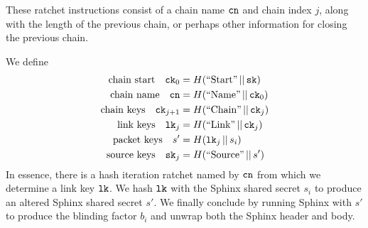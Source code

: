 \documentclass[twoside,letterpaper]{sig-alternate}
\def\mathcomma{,}
\def\mathperiod{.}
\def\mathcomma{}
\def\mathperiod{}
\begin{document}
These ratchet instructions consist of
 a chain name $\texttt{cn}$ and chain index $j$,
along with the length of the previous chain, or
 perhaps other information for closing the previous chain.  

We define
\[ \begin{aligned}
\textrm{chain start}\quad
 \ck_0 &= H(\textrm{``Start''} \,||\, \sk) \mathcomma \\
\textrm{chain name}\quad
 \cn &= H(\textrm{``Name''} \,||\, \ck_0) \mathcomma \\
\textrm{chain keys}\quad
 \ck_{j+1} &= H(\textrm{``Chain''} \,||\, \ck_j) \mathcomma \\
\textrm{link keys}\quad
 \lk_j &= H(\textrm{``Link''} \,||\, \ck_j) \mathcomma \\
\textrm{packet keys}\quad 
 s' &= H(\lk_j \,||\, s_i) \mathcomma \\ %
\textrm{source keys}\quad 
 \sk_j &= H(\textrm{``Source''} \,||\, s') \mathperiod \\
\end{aligned} \]
In essence, there is a hash iteration ratchet named by $\texttt{cn}$
from which we determine a link key $\texttt{lk}$.
We hash $\texttt{lk}$ with the Sphinx shared secret $s_i$ to produce
an altered Sphinx shared secret $s'$.
We finally conclude by running Sphinx with $s'$ to produce the 
blinding factor $b_i$ and unwrap both the Sphinx header and body. 

\begin{figure}[th!]
\end{figure}
\end{document}
